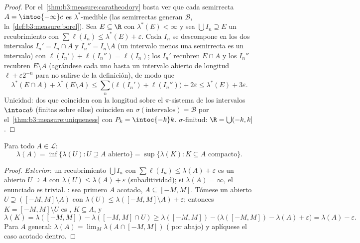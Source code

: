 \begin{proof}
Por el~\cref{thm:b3:measure:caratheodory} basta ver que cada semirrecta
$A = \intoo{-\infty}c$ es $\lambda^*$-medible (las semirrectas generan
$\mathcal B$, la~\cref{def:b3:measure:borel}). Sea $E \subseteq \R$ con
$\lambda^*(E) < \infty$ y sea $\bigcup I_n \supseteq E$ un recubrimiento
con $\sum\ell(I_n) \leq \lambda^*(E) + \varepsilon$. Cada $I_n$ se
descompone en los dos intervalos $I_n' = I_n \cap A$ y
$I_n'' = I_n\setminus A$ (un intervalo menos una semirrecta es un
intervalo) con $\ell(I_n') + \ell(I_n'') = \ell(I_n)$; los $I_n'$
recubren $E \cap A$ y los $I_n''$ recubren $E \setminus A$ (agrándese
cada uno hasta un intervalo abierto de longitud $\ell +
\varepsilon2^{-n}$ para no salirse de la definición), de modo que
\[
\lambda^*(E\cap A) + \lambda^*(E\setminus A)
\leq \sum_n\bigl(\ell(I_n') + \ell(I_n'')\bigr) + 2\varepsilon
\leq \lambda^*(E) + 3\varepsilon .
\]
Unicidad: dos  que coinciden con
la longitud sobre el $\pi$-sistema de los intervalos $\intoc ab$
(finitas sobre ellos) coinciden en
$\sigma(\text{intervalos}) = \mathcal B$ por
el~\cref{thm:b3:measure:uniqueness} con $P_k = \intoc{-k}k$.
$\sigma$-finitud: $\R = \bigcup(-k, k]$.
\end{proof}

\begin{theorem}[Regularidad]\label{thm:b3:measure:regularity}
Para todo $A \in \mathcal L$:
\[
\lambda(A) = \inf\{\lambda(U) : U \supseteq A \text{ abierto}\}
= \sup\{\lambda(K) : K \subseteq A \text{ compacto}\}.
\]
\end{theorem}

\begin{proof}
\emph{Exterior}: un recubrimiento $\bigcup I_n$ con $\sum\ell(I_n) \leq
\lambda(A) + \varepsilon$ es un
abierto $U \supseteq A$ con
$\lambda(U) \leq \lambda(A) + \varepsilon$ (subaditividad); si
$\lambda(A) = \infty$, el enunciado es trivial. \emph{}: sea
primero $A$ acotado, $A \subseteq [-M, M]$. Tómese un abierto
$U \supseteq ([-M,M]\setminus A)$ con $\lambda(U) \leq
\lambda([-M,M]\setminus A) + \varepsilon$; entonces $K = [-M,
M]\setminus U$ es ,
$K \subseteq A$, y
\[
\lambda(K) = \lambda([-M,M]) - \lambda([-M,M]\cap U)
\geq \lambda([-M,M]) - \bigl(\lambda([-M,M]) - \lambda(A) +
\varepsilon\bigr) = \lambda(A) - \varepsilon .
\]
Para $A$ general: $\lambda(A) = \lim_M\lambda(A\cap[-M,M])$
( por abajo) y aplíquese
el caso acotado dentro.
\end{proof}

